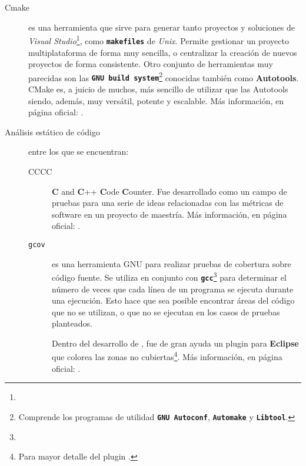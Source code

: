 \begin{description}
\item[Cmake] es una herramienta que sirve para generar tanto proyectos y soluciones de \textit{Visual Studio}\footnote{}, como \texttt{\textbf{makefiles}} de \textit{Unix}. Permite gestionar un proyecto multiplataforma de forma muy sencilla, o centralizar la creación de nuevos proyectos de forma consistente. Otro conjunto de herramientas muy parecidas son las \textbf{\texttt{GNU build system}}\footnote{Comprende los programas de utilidad \textbf{\texttt{GNU Autoconf}}, \textbf{\texttt{Automake}} y \textbf{\texttt{Libtool}}.} conocidas también como \textbf{Autotools}. CMake es, a juicio de muchos, más sencillo de utilizar que las Autotools siendo, además, muy versátil, potente y escalable. Más información, en página oficial: .

\item [Análisis estático de código] entre los que se encuentran:

\begin{description}

\item [CCCC] \textbf{C} and \textbf{C}++ \textbf{C}ode \textbf{C}ounter. Fue desarrollado como un campo de pruebas para una serie de ideas relacionadas con las métricas de software en un proyecto de maestría. Más información, en página oficial: .

\item [\texttt{gcov}] es una herramienta GNU para realizar pruebas de cobertura sobre código fuente. Se utiliza en conjunto con \texttt{\textbf{gcc}}\footnote{} para determinar el número de veces que cada línea de un programa se ejecuta durante una ejecución. Esto hace que sea posible encontrar áreas del código que no se utilizan, o que no se ejecutan en los casos de pruebas planteados. 

Dentro del desarrollo de \maggen, fue de gran ayuda un plugin para \textbf{Eclipse} que colorea las zonas no cubiertas\footnote{Para mayor detalle del plugin .}. Más información, en página oficial: .

\end{description}

\end{description}